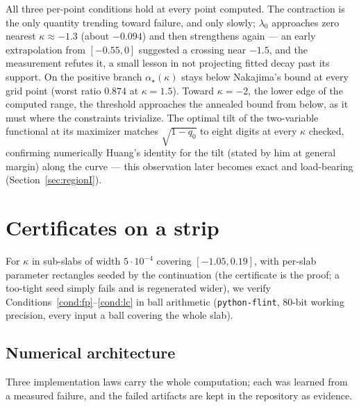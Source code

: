 \documentclass[11pt]{article}
\theoremstyle{remark}
\begin{document}
All three per-point conditions hold at every point computed.  The
contraction is the only quantity trending toward failure, and only
slowly; $\lambda_0$ approaches zero nearest $\kappa\approx-1.3$
(about $-0.094$) and then strengthens again --- an early extrapolation
from $[-0.55,0]$ suggested a crossing near $-1.5$, and the
measurement refutes it, a small lesson in not projecting fitted decay
past its support.  On the positive branch $\alpha_\star(\kappa)$
stays below Nakajima's bound at every grid point (worst ratio $0.874$
at $\kappa=1.5$).  Toward $\kappa=-2$, the lower edge of the computed range, the
threshold approaches the annealed bound from below, as it must where the constraints
trivialize.  The optimal tilt of the two-variable functional at its
maximizer matches $\sqrt{1-q_0}$ to eight digits at every $\kappa$
checked, confirming numerically Huang's identity for the tilt (stated
by him at general margin) along the curve --- this observation later
becomes exact and load-bearing (Section~\ref{sec:regionI}).

\section{Certificates on a strip}\label{sec:slabs}

For $\kappa$ in sub-slabs of width $5\cdot10^{-4}$ covering
$[-1.05,0.19]$, with per-slab parameter rectangles seeded by the
continuation (the certificate is the proof; a too-tight seed simply
fails and is regenerated wider), we verify
Conditions~\ref{cond:fp}--\ref{cond:lc} in ball arithmetic
(\texttt{python-flint}, 80-bit working precision, every input a ball
covering the whole slab).

\subsection{Numerical architecture}\label{sec:architecture}

Three implementation laws carry the whole computation; each was
learned from a measured failure, and the failed artifacts are kept in
the repository as evidence.
\end{document}
